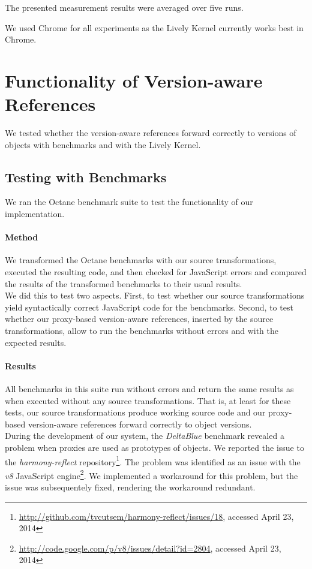 The presented measurement results were averaged over five runs.

We used Chrome for all experiments as the Lively Kernel currently works best in Chrome.



\section{Functionality of Version-aware References} \label{sec:EVALUATION:2}

We tested whether the version-aware references forward correctly to versions of objects with benchmarks and with the Lively Kernel.

\subsection{Testing with Benchmarks}

We ran the Octane benchmark suite to test the functionality of our implementation.

\paragraph{Method}
We transformed the Octane benchmarks with our source transformations, executed the resulting code, and then checked for JavaScript errors and compared the results of the transformed benchmarks to their usual results.\\
We did this to test two aspects.
First, to test whether our source transformations yield syntactically correct JavaScript code for the benchmarks.
Second, to test whether our proxy-based version-aware references, inserted by the source transformations, allow to run the benchmarks without errors and with the expected results.


\paragraph{Results}
All benchmarks in this suite run without errors and return the same results as when executed without any source transformations.
That is, at least for these tests, our source transformations produce working source code and our proxy-based version-aware references forward correctly to object versions.\\
During the development of our system, the \emph{DeltaBlue} benchmark revealed a problem when proxies are used as prototypes of objects.
We reported the issue to the \emph{harmony-reflect} repository\footnote{\url{http://github.com/tvcutsem/harmony-reflect/issues/18}, accessed April 23, 2014}.
The problem was identified as an issue with the \emph{v8} JavaScript engine\footnote{\url{http://code.google.com/p/v8/issues/detail?id=2804}, accessed April 23, 2014}.
We implemented a workaround for this problem, but the issue was subsequentely fixed, rendering the workaround redundant.

